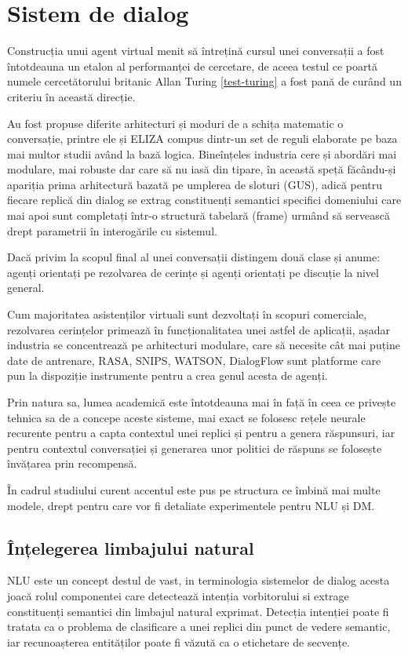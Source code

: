 \chapter{Sistem de dialog}


Construcția unui agent virtual menit să întrețină cursul unei conversații a fost întotdeauna un etalon al performanței de cercetare, de aceea testul ce poartă numele cercetătorului britanic Allan Turing \ref{test-turing} a fost pană de curând un criteriu în această direcție.

Au fost propuse diferite arhitecturi și moduri de a schița matematic o conversație, printre ele și ELIZA compus dintr-un set de reguli elaborate pe baza mai multor studii având la bază logica. Bineînțeles industria cere și abordări mai modulare, mai robuste dar care să nu iasă din tipare, în această speță făcându-și apariția prima arhitectură bazată pe umplerea de sloturi (GUS), adică pentru fiecare replică din dialog se extrag constituenți semantici specifici domeniului care mai apoi sunt completați într-o structură tabelară (frame) urmând să servească drept parametrii în interogările cu sistemul.

Dacă privim la scopul final al unei conversații distingem două clase și anume: agenți orientați pe rezolvarea de cerințe și agenți orientați pe discuție la nivel general.

Cum majoritatea asistenților virtuali sunt dezvoltați în scopuri comerciale, rezolvarea cerințelor primează în funcționalitatea unei astfel de aplicații, așadar industria se concentrează pe arhitecturi modulare, care să necesite cât mai puține date de antrenare, RASA, SNIPS, WATSON, DialogFlow sunt platforme care pun la dispoziție instrumente pentru a crea genul acesta de agenți.

Prin natura sa, lumea academică este întotdeauna mai în față în ceea ce privește tehnica sa de a concepe aceste sisteme, mai exact se folosesc rețele neurale recurente pentru a capta contextul unei replici și pentru a genera răspunsuri, iar pentru contextul conversației și generarea unor politici de răspuns se folosește învățarea prin recompensă. \cite{rl-seq2seq}

În cadrul studiului curent accentul este pus pe structura ce îmbină mai multe modele, drept pentru care vor fi detaliate experimentele pentru NLU și DM.

\section{Înțelegerea limbajului natural}
NLU este un concept destul de vast, in terminologia sistemelor de dialog acesta joacă rolul componentei care detectează intenția vorbitorului si extrage constituenți semantici din limbajul natural exprimat.
Detecția intenției poate fi tratata ca o problema de clasificare a unei replici din punct de vedere semantic, iar recunoașterea entităților poate fi văzută ca o etichetare de secvențe.

